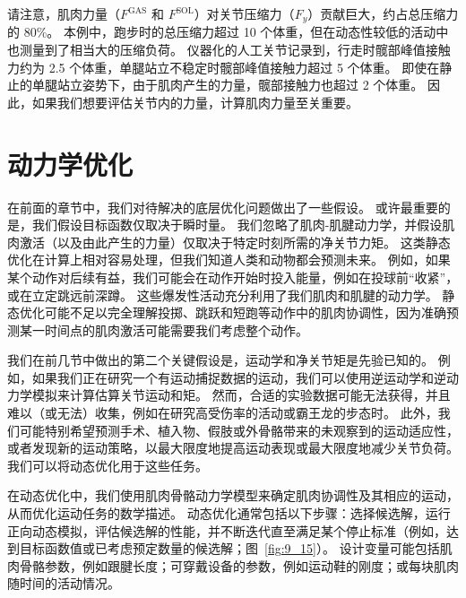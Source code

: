 请注意，肌肉力量（$F^\text{GAS}$ 和 $F^\text{SOL}$）对关节压缩力（$F_y$）贡献巨大，约占总压缩力的 80\%。
本例中，跑步时的总压缩力超过 10 个体重，但在动态性较低的活动中也测量到了相当大的压缩负荷。
仪器化的人工关节记录到，行走时髋部峰值接触力约为 2.5 个体重，单腿站立不稳定时髋部峰值接触力超过 5 个体重。
即使在静止的单腿站立姿势下，由于肌肉产生的力量，髋部接触力也超过 2 个体重。
因此，如果我们想要评估关节内的力量，计算肌肉力量至关重要。


\section{动力学优化}

在前面的章节中，我们对待解决的底层优化问题做出了一些假设。
或许最重要的是，我们假设目标函数仅取决于瞬时量。
我们忽略了肌肉-肌腱动力学，并假设肌肉激活（以及由此产生的力量）仅取决于特定时刻所需的净关节力矩。
这类静态优化在计算上相对容易处理，但我们知道人类和动物都会预测未来。
例如，如果某个动作对后续有益，我们可能会在动作开始时投入能量，例如在投球前“收紧”，或在立定跳远前深蹲。
这些爆发性活动充分利用了我们肌肉和肌腱的动力学。
静态优化可能不足以完全理解投掷、跳跃和短跑等动作中的肌肉协调性，因为准确预测某一时间点的肌肉激活可能需要我们考虑整个动作。


我们在前几节中做出的第二个关键假设是，运动学和净关节矩是先验已知的。
例如，如果我们正在研究一个有运动捕捉数据的运动，我们可以使用逆运动学和逆动力学模拟来计算估算关节运动和矩。
然而，合适的实验数据可能无法获得，并且难以（或无法）收集，例如在研究高受伤率的活动或霸王龙的步态时。
此外，我们可能特别希望预测手术、植入物、假肢或外骨骼带来的未观察到的运动适应性，或者发现新的运动策略，以最大限度地提高运动表现或最大限度地减少关节负荷。
我们可以将动态优化用于这些任务。



在动态优化中，我们使用肌肉骨骼动力学模型来确定肌肉协调性及其相应的运动，从而优化运动任务的数学描述。
动态优化通常包括以下步骤：选择候选解，运行正向动态模拟，评估候选解的性能，并不断迭代直至满足某个停止标准（例如，达到目标函数值或已考虑预定数量的候选解；图~\ref{fig:9_15}）。
设计变量可能包括肌肉骨骼参数，例如跟腱长度；可穿戴设备的参数，例如运动鞋的刚度；或每块​​肌肉随时间的活动情况。


